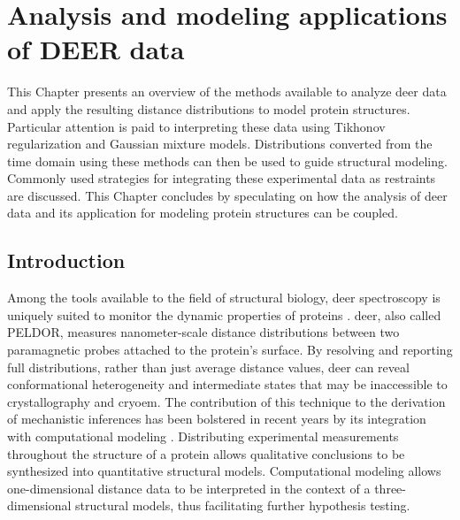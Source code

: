 \clearpage %

\chapter{Analysis and modeling applications of DEER data}\label{ch:intro_deer}

\bigskip

This Chapter presents an overview of the methods available to analyze \gls{deer} data and apply the resulting distance distributions to model protein structures. Particular attention is paid to interpreting these data using Tikhonov regularization and Gaussian mixture models. Distributions converted from the time domain using these methods can then be used to guide structural modeling. Commonly used strategies for integrating these experimental data as restraints are discussed. This Chapter concludes by speculating on how the analysis of \gls{deer} data and its application for modeling protein structures can be coupled.

\section{Introduction}

Among the tools available to the field of structural biology, \gls{deer} spectroscopy is uniquely suited to monitor the dynamic properties of proteins \citep*{Hubbell2000, Jeschke2012, Mchaourab2011}. \Gls{deer}, also called PELDOR, measures nanometer-scale distance distributions between two paramagnetic probes attached to the protein's surface. By resolving and reporting full distributions, rather than just average distance values, \gls{deer} can reveal conformational heterogeneity and intermediate states that may be inaccessible to crystallography and \gls{cryoem}. The contribution of this technique to the derivation of mechanistic inferences has been bolstered in recent years by its integration with computational modeling \citep*{Jeschke2018a}. Distributing experimental measurements throughout the structure of a protein allows qualitative conclusions to be synthesized into quantitative structural models. Computational modeling allows one-dimensional distance data to be interpreted in the context of a three-dimensional structural models, thus facilitating further hypothesis testing.

